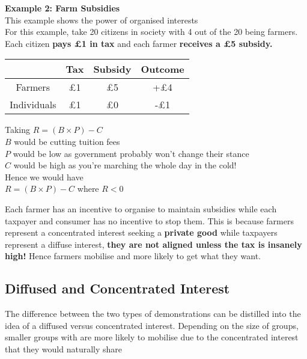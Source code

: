 \documentclass[12pt, letterpaper]{article}
\begin{document}
\begin{center}
\textbf{Example 2: Farm Subsidies} \\
This example shows the power of organised interests \\
For this example, take 20 citizens in society with 4 out of the 20 being farmers. Each citizen \textbf{pays £1 in tax} and each farmer \textbf{receives a £5 subsidy.}

\begin{center}
\begin{tabular}{|c|c|c|c|}

	\hline
	& Tax & Subsidy & Outcome \\
	\hline
	\hline
	Farmers & £1 & £5 & +£4 \\
	\hline
	Individuals & £1 & £0 & -£1 \\
	\hline

\end{tabular}
\end{center}

Taking $R=(B \times P) - C$ \\
$B$ would be cutting tuition fees \\
$P$ would be low as government probably won't change their stance \\
$C$ would be high as you're marching the whole day in the cold! \\
Hence we would have \\
$R=(B \times P) - C$ where $R<0$
\end{center}

Each farmer has an incentive to organise to maintain subsidies while each taxpayer and consumer has no incentive to stop them. This is because farmers represent a concentrated interest seeking a \textbf{private good} while taxpayers represent a diffuse interest, \textbf{they are not aligned unless the tax is insanely high!} Hence farmers mobilise and more likely to get what they want.

\subsection{Diffused and Concentrated Interest}
The difference between the two types of demonstrations can be distilled into the idea of a diffused versus concentrated interest. Depending on the size of groups, smaller groups with are more likely to mobilise due to the concentrated interest that they would naturally share



\newpage
\end{document}
